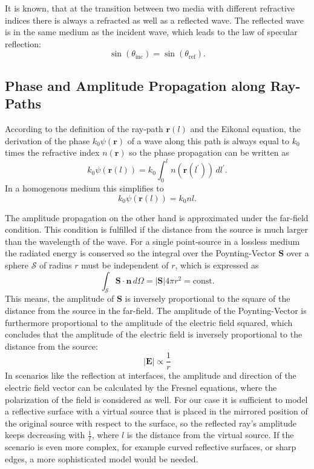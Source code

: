 It is known, that at the transition between two media with different refractive indices there is always a refracted as well as a reflected wave.
The reflected wave is in the same medium as the incident wave, which leads to the law of specular reflection:
\begin{equation}
    \sin(\theta_{\text{inc}}) = \sin(\theta_{\text{ref}}).
\end{equation}


\subsection{Phase and Amplitude Propagation along Ray-Paths}
According to the definition of the ray-path \(\bm{r}(l)\) and the Eikonal equation, the derivation of the phase \(k_0 \psi(\bm{r})\) of a wave along this path is always equal to \(k_0\) times the refractive index \(n(\bm{r})\) so the phase propagation can be written as
\begin{equation}
    k_0 \psi(\bm{r}(l)) = k_0 \int_{0}^{l} n(\bm{r}(l^{\prime})) \, dl^{\prime}.
\end{equation}
In a homogenous medium this simplifies to
\begin{equation}
    k_0 \psi(\bm{r}(l)) = k_0 n l.
\end{equation}

The amplitude propagation on the other hand is approximated under the far-field condition.
This condition is fulfilled if the distance from the source is much larger than the wavelength of the wave.
For a single point-source in a lossless medium the radiated energy is conserved so the integral over the Poynting-Vector \(\bm{S}\) over a sphere \(\mathcal{S} \) of radius \(r\) must be independent of \(r\), which is expressed as
\begin{equation}
    \int_\mathcal{S}  \bm{S} \cdot \bm{n} \, d\Omega = |\bm{S}| 4\pi r^2 = \text{const}.
\end{equation}
This means, the amplitude of \(\bm{S}\) is inversely proportional to the square of the distance from the source in the far-field.
The amplitude of the Poynting-Vector is furthermore proportional to the amplitude of the electric field squared, which concludes that the amplitude of the electric field is inversely proportional to the distance from the source:
\begin{equation}
    |\bm{E}| \propto \frac{1}{r}
\end{equation}
In scenarios like the reflection at interfaces, the amplitude and direction of the electric field vector can be calculated by the Fresnel equations, where the polarization of the field is considered as well.
For our case it is sufficient to model a reflective surface with a virtual source that is placed in the mirrored position of the original source with respect to the surface, so the reflected ray's amplitude keeps decreasing with \(\frac{1}{l}\), where \(l\) is the distance from the virtual source.
If the scenario is even more complex, for example curved reflective surfaces, or sharp edges, a more sophisticated model would be needed.

